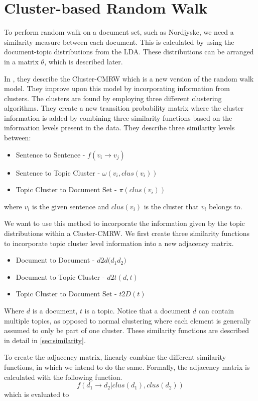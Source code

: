 \section{Cluster-based Random Walk}
To perform random walk on a document set, such as Nordjyske, we need a similarity measure between each document.
This is calculated by using the document-topic distributions from the \gls{LDA}.
These distributions can be arranged in a matrix $\theta$, which is described later.

In \cite{ClusterPageRank}, they describe the \gls{Cluster-CMRW} which is a new version of the random walk model. 
They improve upon this model by incorporating information from clusters. 
The clusters are found by employing three different clustering algorithms.
They create a new transition probability matrix where the cluster information is added by combining three similarity functions based on the information levels present in the data.
They describe three similarity levels between:
\begin{itemize}
    \item Sentence to Sentence - $f(v_i \rightarrow v_j)$
    \item Sentence to Topic Cluster - $\omega(v_i, clus(v_i))$
    \item Topic Cluster to Document Set - $\pi(clus(v_i))$
\end{itemize}
where $v_i$ is the given sentence and $clus(v_i)$ is the cluster that $v_i$ belongs to.

We want to use this method to incorporate the information given by the topic distributions within a \gls{Cluster-CMRW}. 
We first create three similarity functions to incorporate topic cluster level information into a new adjacency matrix.
\begin{itemize}
    \item Document to Document - $d2d(d_1 $\rightarrow$ d_2)$
    \item Document to Topic Cluster - $d2t(d,t)$
    \item Topic Cluster to Document Set - $t2D(t)$
\end{itemize}

\noindent
Where $d$ is a document, $t$ is a topic.
Notice that a document $d$ can contain multiple topics, as opposed to normal clustering where each element is generally assumed to only be part of one cluster.
These similarity functions are described in detail in \autoref{sec:similarity}.

To create the adjacency matrix, \cite{ClusterPageRank} linearly combine the different similarity functions, in which we intend to do the same.
Formally, the adjacency matrix is calculated with the following function.
$$ f(d_1 \rightarrow d_2 | clus(d_1), clus(d_2)) $$
which is evaluated to 

